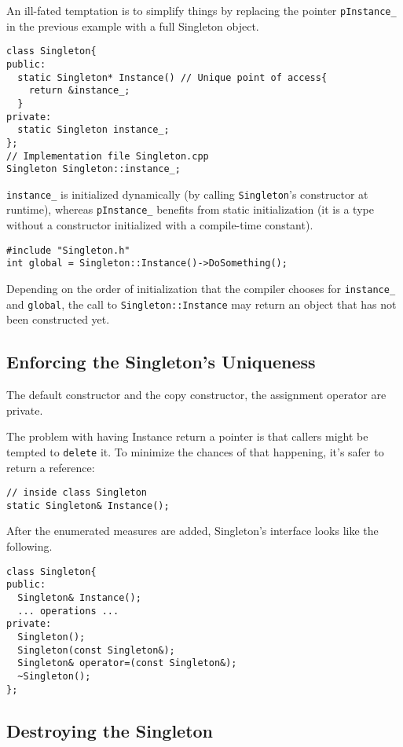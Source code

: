 An ill-fated temptation is to simplify things by replacing the pointer
\texttt{pInstance\_} in the previous example with a full Singleton
object.
\begin{verbatim}
class Singleton{
public:
  static Singleton* Instance() // Unique point of access{
    return &instance_;
  }
private:
  static Singleton instance_;
};
// Implementation file Singleton.cpp
Singleton Singleton::instance_;
\end{verbatim}

\texttt{instance\_} is initialized dynamically (by calling
\texttt{Singleton}'s constructor at runtime), whereas 
\texttt{pInstance\_} benefits from static initialization (it is a type
without a constructor initialized with a compile-time constant).

\begin{verbatim}
#include "Singleton.h"
int global = Singleton::Instance()->DoSomething();
\end{verbatim}

Depending on the order of initialization that the compiler chooses for
\texttt{instance\_} and \texttt{global}, the call to
\texttt{Singleton::Instance} may return an object that has not been
constructed yet.

\subsection{Enforcing the Singleton's Uniqueness}

 The default constructor and the copy constructor, the assignment
 operator are private.

 The problem with having Instance return a pointer is that callers
 might be tempted to \texttt{delete} it. To minimize the
chances of that happening, it's safer to return a reference:
\begin{verbatim}
// inside class Singleton
static Singleton& Instance();
\end{verbatim}

After the enumerated measures are added, Singleton's interface looks
like the following.
\begin{verbatim}
class Singleton{
public:
  Singleton& Instance();
  ... operations ...
private:
  Singleton();
  Singleton(const Singleton&);
  Singleton& operator=(const Singleton&);
  ~Singleton();
};
\end{verbatim}

\subsection{Destroying the Singleton}

